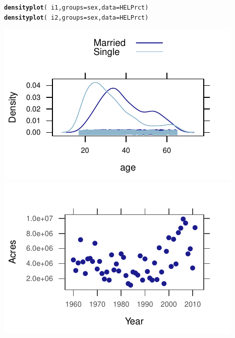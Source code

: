 \documentclass[twoside]{book}\usepackage[]{graphicx}\usepackage[]{xcolor}
\makeatletter
\def\maxwidth{ %
  \ifdim\Gin@nat@width>\linewidth
    \linewidth
  \else
    \Gin@nat@width
  \fi
}
\newcommand{\hlopt}[1]{\textcolor[rgb]{0,0,0}{#1}}%
\newcommand{\hlstd}[1]{\textcolor[rgb]{0.345,0.345,0.345}{#1}}%
\newcommand{\hlkwc}[1]{\textcolor[rgb]{0.333,0.667,0.333}{#1}}%
\newcommand{\hlkwd}[1]{\textcolor[rgb]{0.737,0.353,0.396}{\textbf{#1}}}%
\newenvironment{kframe}{%
 \def\at@end@of@kframe{}%
 \ifinner\ifhmode%
  \def\at@end@of@kframe{\end{minipage}}%
  \begin{minipage}{\columnwidth}%
 \fi\fi%
 \def\FrameCommand##1{\hskip\@totalleftmargin \hskip-\fboxsep
 \colorbox{shadecolor}{##1}\hskip-\fboxsep
     \hskip-\linewidth \hskip-\@totalleftmargin \hskip\columnwidth}%
 \MakeFramed {\advance\hsize-\width
   \@totalleftmargin\z@ \linewidth\hsize
   \@setminipage}}%
 {\par\unskip\endMakeFramed%
 \at@end@of@kframe}
\newenvironment{knitrout}{}{} %
\makeatother
\begin{document}
\begin{solution}
\begin{knitrout}
\color{fgcolor}\begin{kframe}
\begin{alltt}
\hlkwd{densityplot}\hlstd{(}\hlopt{~}\hlstd{i1,} \hlkwc{groups} \hlstd{= sex,} \hlkwc{data} \hlstd{= HELPrct)}
\hlkwd{densityplot}\hlstd{(}\hlopt{~}\hlstd{i2,} \hlkwc{groups} \hlstd{= sex,} \hlkwc{data} \hlstd{= HELPrct)}
\end{alltt}
\end{kframe}

{\centering \includegraphics[width=\maxwidth]{figures/fig-unnamed-chunk-24-1} 
\includegraphics[width=\maxwidth]{figures/fig-unnamed-chunk-24-2} 

}



\end{knitrout}
\end{solution}
\end{document}
